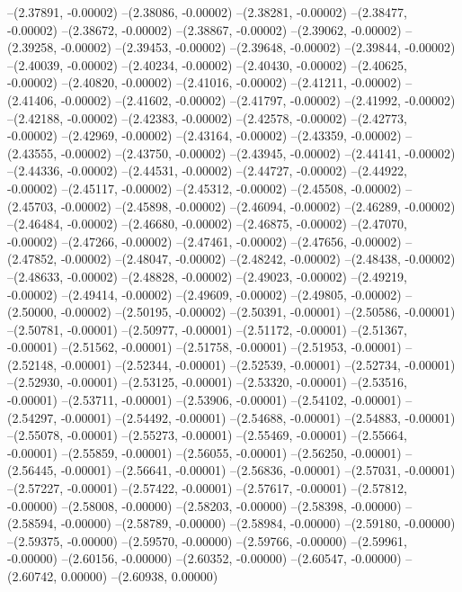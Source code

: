 --(2.37891, -0.00002)
--(2.38086, -0.00002)
--(2.38281, -0.00002)
--(2.38477, -0.00002)
--(2.38672, -0.00002)
--(2.38867, -0.00002)
--(2.39062, -0.00002)
--(2.39258, -0.00002)
--(2.39453, -0.00002)
--(2.39648, -0.00002)
--(2.39844, -0.00002)
--(2.40039, -0.00002)
--(2.40234, -0.00002)
--(2.40430, -0.00002)
--(2.40625, -0.00002)
--(2.40820, -0.00002)
--(2.41016, -0.00002)
--(2.41211, -0.00002)
--(2.41406, -0.00002)
--(2.41602, -0.00002)
--(2.41797, -0.00002)
--(2.41992, -0.00002)
--(2.42188, -0.00002)
--(2.42383, -0.00002)
--(2.42578, -0.00002)
--(2.42773, -0.00002)
--(2.42969, -0.00002)
--(2.43164, -0.00002)
--(2.43359, -0.00002)
--(2.43555, -0.00002)
--(2.43750, -0.00002)
--(2.43945, -0.00002)
--(2.44141, -0.00002)
--(2.44336, -0.00002)
--(2.44531, -0.00002)
--(2.44727, -0.00002)
--(2.44922, -0.00002)
--(2.45117, -0.00002)
--(2.45312, -0.00002)
--(2.45508, -0.00002)
--(2.45703, -0.00002)
--(2.45898, -0.00002)
--(2.46094, -0.00002)
--(2.46289, -0.00002)
--(2.46484, -0.00002)
--(2.46680, -0.00002)
--(2.46875, -0.00002)
--(2.47070, -0.00002)
--(2.47266, -0.00002)
--(2.47461, -0.00002)
--(2.47656, -0.00002)
--(2.47852, -0.00002)
--(2.48047, -0.00002)
--(2.48242, -0.00002)
--(2.48438, -0.00002)
--(2.48633, -0.00002)
--(2.48828, -0.00002)
--(2.49023, -0.00002)
--(2.49219, -0.00002)
--(2.49414, -0.00002)
--(2.49609, -0.00002)
--(2.49805, -0.00002)
--(2.50000, -0.00002)
--(2.50195, -0.00002)
--(2.50391, -0.00001)
--(2.50586, -0.00001)
--(2.50781, -0.00001)
--(2.50977, -0.00001)
--(2.51172, -0.00001)
--(2.51367, -0.00001)
--(2.51562, -0.00001)
--(2.51758, -0.00001)
--(2.51953, -0.00001)
--(2.52148, -0.00001)
--(2.52344, -0.00001)
--(2.52539, -0.00001)
--(2.52734, -0.00001)
--(2.52930, -0.00001)
--(2.53125, -0.00001)
--(2.53320, -0.00001)
--(2.53516, -0.00001)
--(2.53711, -0.00001)
--(2.53906, -0.00001)
--(2.54102, -0.00001)
--(2.54297, -0.00001)
--(2.54492, -0.00001)
--(2.54688, -0.00001)
--(2.54883, -0.00001)
--(2.55078, -0.00001)
--(2.55273, -0.00001)
--(2.55469, -0.00001)
--(2.55664, -0.00001)
--(2.55859, -0.00001)
--(2.56055, -0.00001)
--(2.56250, -0.00001)
--(2.56445, -0.00001)
--(2.56641, -0.00001)
--(2.56836, -0.00001)
--(2.57031, -0.00001)
--(2.57227, -0.00001)
--(2.57422, -0.00001)
--(2.57617, -0.00001)
--(2.57812, -0.00000)
--(2.58008, -0.00000)
--(2.58203, -0.00000)
--(2.58398, -0.00000)
--(2.58594, -0.00000)
--(2.58789, -0.00000)
--(2.58984, -0.00000)
--(2.59180, -0.00000)
--(2.59375, -0.00000)
--(2.59570, -0.00000)
--(2.59766, -0.00000)
--(2.59961, -0.00000)
--(2.60156, -0.00000)
--(2.60352, -0.00000)
--(2.60547, -0.00000)
--(2.60742, 0.00000)
--(2.60938, 0.00000)
